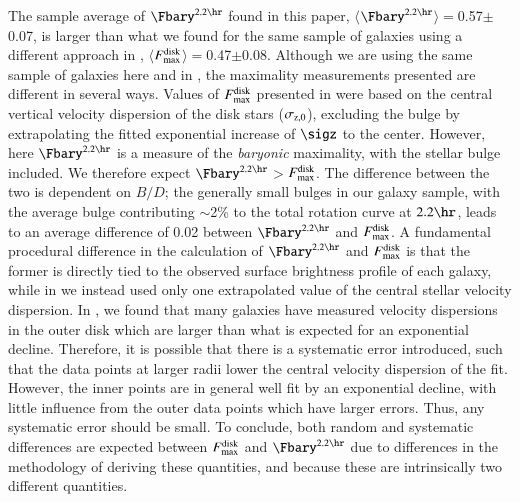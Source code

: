 \documentclass[traditabstract]{aa} %
\begin{document}
The sample average of $\Fbary^{2.2\hr}$ found in this paper,
$\langle$$\Fbary^{2.2\hr}$$\rangle$$=$0.57$\pm$0.07, is larger than what we found for the
same sample of galaxies using a different approach in ,
$\langle$$F_{\rm max}^{\rm disk}$$\rangle$$=$0.47$\pm$0.08.
%
Although we are using the same sample of galaxies here and in ,
the maximality measurements presented are different in several ways.
Values of $F_{\rm max}^{\rm disk}$ presented in  were based
on the central vertical velocity dispersion of the disk stars ($\sigma_{\rm z,0}$),
excluding the bulge by extrapolating the fitted exponential increase of $\sigz$ to the
center.
However, here $\Fbary^{2.2\hr}$ is a measure of the {\it baryonic} maximality, with the 
stellar bulge included. We therefore expect $\Fbary^{2.2\hr}$$>$$F_{\rm max}^{\rm disk}$. 
The difference between the two is dependent on $B/D$; the generally small bulges in our
galaxy sample, with the average bulge contributing $\sim$2\% to the total rotation curve
at $2.2\hr$, leads to an average difference of 0.02 between $\Fbary^{2.2\hr}$ and
$F_{\rm max}^{\rm disk}$.
A fundamental procedural difference in the calculation of $\Fbary^{2.2\hr}$ and 
$F_{\rm max}^{\rm disk}$ is that the former is directly tied to the observed surface 
brightness profile of each galaxy, while in  we instead used only
one extrapolated value of the central stellar velocity dispersion.
In , we found that many galaxies have measured velocity
dispersions in the outer disk which are larger than what is expected for an exponential
decline. Therefore, it is possible that there is a systematic error introduced, such that
the data points at larger radii lower the central velocity dispersion of the fit. However,
the inner points are in general well fit by an exponential decline, with little influence
from the outer data points which have larger errors. Thus, any systematic error should be
small.
%
To conclude, both random and systematic differences are expected between 
$F_{\rm max}^{\rm disk}$ and $\Fbary^{2.2\hr}$ due to differences in the methodology of
deriving these quantities, and because these are intrinsically two different quantities.
\end{document}
